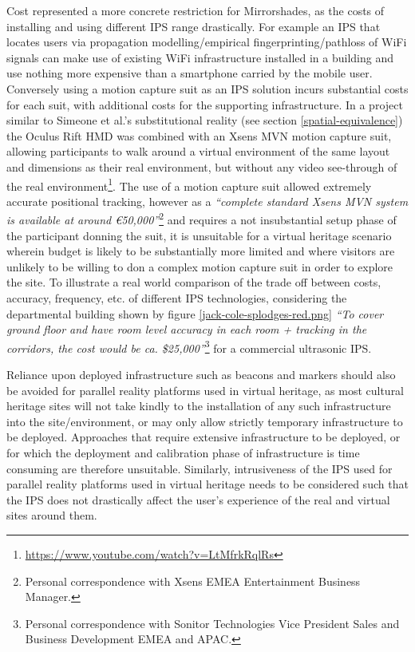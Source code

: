 Cost represented a more concrete restriction for Mirrorshades, as the costs of installing and using different IPS range drastically. For example an IPS that locates users via propagation modelling/empirical fingerprinting/pathloss of WiFi signals can make use of existing WiFi infrastructure installed in a building and use nothing more expensive than a smartphone carried by the mobile user. Conversely using a motion capture suit as an IPS solution incurs substantial costs for each suit, with additional costs for the supporting infrastructure. In a project similar to Simeone et al.'s substitutional reality (see section \ref{spatial-equivalence}) the Oculus Rift HMD was combined with an Xsens MVN motion capture suit, allowing participants to walk around a virtual environment of the same layout and dimensions as their real environment, but without any video see-through of the real environment\footnote{\url{https://www.youtube.com/watch?v=LtMfrkRqlRs}}. The use of a motion capture suit allowed extremely accurate positional tracking, however as a \textit{``complete standard Xsens MVN system is available at around \euro{}50,000''}\footnote{Personal correspondence with Xsens EMEA Entertainment Business Manager.} and requires a not insubstantial setup phase of the participant donning the suit, it is unsuitable for a virtual heritage scenario wherein budget is likely to be substantially more limited and  where visitors are unlikely to be willing to don a complex motion capture suit in order to explore the site. To illustrate a real world comparison of the trade off between costs, accuracy, frequency, etc. of different IPS technologies, considering the departmental building shown by figure \ref{jack-cole-splodges-red.png} \textit{``To cover ground floor and have room level accuracy in each room + tracking in the corridors, the cost would be ca. \$25,000''}\footnote{Personal correspondence with Sonitor Technologies Vice President Sales and Business Development EMEA and APAC.} for a commercial ultrasonic IPS.

Reliance upon deployed infrastructure such as beacons and markers should also be avoided for parallel reality platforms used in virtual heritage, as most cultural heritage sites will not take kindly to the installation of any such infrastructure into the site/environment, or may only allow strictly temporary infrastructure to be deployed. Approaches that require extensive infrastructure to be deployed, or for which the deployment and calibration phase of infrastructure is time consuming are therefore unsuitable. Similarly, intrusiveness of the IPS used for parallel reality platforms used in virtual heritage needs to be considered such that the IPS does not drastically affect the user's experience of the real and virtual sites around them.


